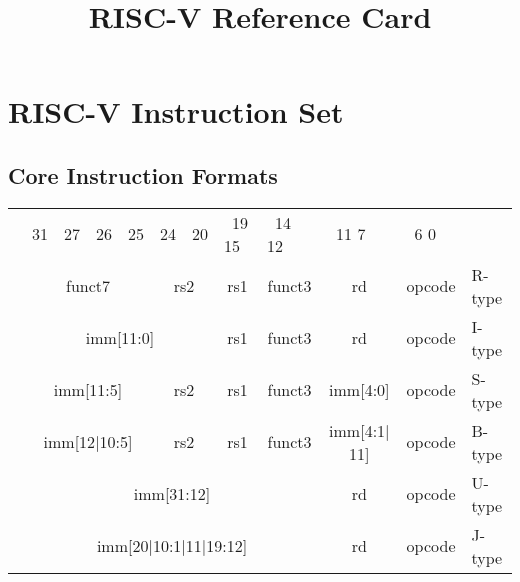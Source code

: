 \documentclass{article}
\title{RISC-V Reference Card}
\author{}
\date{}
\newcommand{\instbit}[1]{\mbox{\scriptsize #1}}
\newcommand{\instbitrange}[2]{~\instbit{#1} \hfill \instbit{#2}~}
\begin{document}
\maketitle

\section*{RISC-V Instruction Set}

\subsection*{Core Instruction Formats}
\small
\begin{center}
\begin{tabular}
{p{0in}p{0.4in}p{0.05in}p{0.05in}p{0.05in}p{0.05in}p{0.4in}p{0.6in}p{0.4in}p{0.6in}p{0.7in}l}
&
\multicolumn{1}{l}{\instbit{31}} &
\multicolumn{1}{r}{\instbit{27}} &
\instbit{26} &
\instbit{25} &
\multicolumn{1}{l}{\instbit{24}} &
\multicolumn{1}{r}{\instbit{20}} &
\instbitrange{19}{15} &
\instbitrange{14}{12} &
\instbitrange{11}{7} &
\instbitrange{6}{0} \\
\cline{2-11}

&
\multicolumn{4}{|c|}{funct7} &
\multicolumn{2}{c|}{rs2} &
\multicolumn{1}{c|}{rs1} &
\multicolumn{1}{c|}{funct3} &
\multicolumn{1}{c|}{rd} &
\multicolumn{1}{c|}{opcode} & R-type \\
\cline{2-11}

&
\multicolumn{6}{|c|}{imm[11:0]} &
\multicolumn{1}{c|}{rs1} &
\multicolumn{1}{c|}{funct3} &
\multicolumn{1}{c|}{rd} &
\multicolumn{1}{c|}{opcode} & I-type \\
\cline{2-11}

&
\multicolumn{4}{|c|}{imm[11:5]} &
\multicolumn{2}{c|}{rs2} &
\multicolumn{1}{c|}{rs1} &
\multicolumn{1}{c|}{funct3} &
\multicolumn{1}{c|}{imm[4:0]} &
\multicolumn{1}{c|}{opcode} & S-type \\
\cline{2-11}

&
\multicolumn{4}{|c|}{imm[12$\vert$10:5]} &
\multicolumn{2}{c|}{rs2} &
\multicolumn{1}{c|}{rs1} &
\multicolumn{1}{c|}{funct3} &
\multicolumn{1}{c|}{imm[4:1$\vert$11]} &
\multicolumn{1}{c|}{opcode} & B-type \\
\cline{2-11}

&
\multicolumn{8}{|c|}{imm[31:12]} &
\multicolumn{1}{c|}{rd} &
\multicolumn{1}{c|}{opcode} & U-type \\
\cline{2-11}

&
\multicolumn{8}{|c|}{imm[20$\vert$10:1$\vert$11$\vert$19:12]} &
\multicolumn{1}{c|}{rd} &
\multicolumn{1}{c|}{opcode} & J-type \\
\cline{2-11}
\end{tabular}
\end{center}
\end{document}
